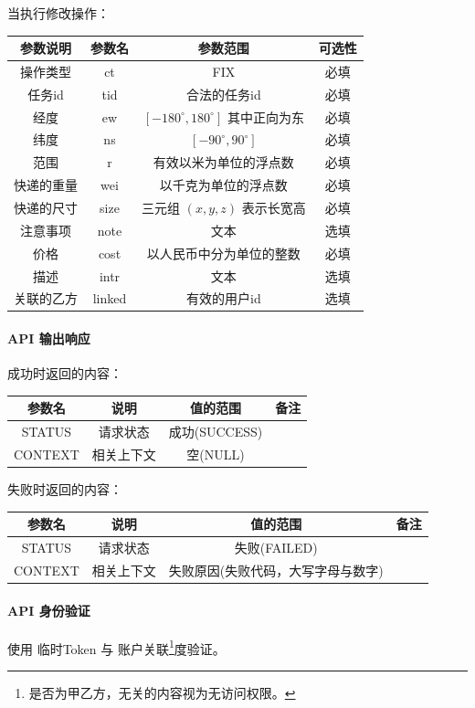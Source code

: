 \documentclass[UTF8]{article}
\def\apiresp{\paragraph{\colorbox[rgb]{0.9,0.9,1}{API 输出响应}}} %
\def\apiauth{\paragraph{\colorbox[rgb]{0.45,0.9,1}{API 身份验证}}} %
\def\失败{\colorbox[rgb]{1,0.5,0.5}{失败}}
\def\成功{\colorbox[rgb]{0.4,1,0.5}{成功}}
\def\成功V{成功(SUCCESS)}
\def\失败V{失败(FAILED)}
\def\失败原因{失败原因(失败代码，大写字母与数字)}
\def\空{空(NULL)}
\begin{document}
    \par 当执行修改操作： \\
    \begin{tabular}{|c|c|c|c|}
        \hline \rule[-2ex]{0pt}{5.5ex} 参数说明 & 参数名 & 参数范围 & 可选性 \\
        \hline \rule[-2ex]{0pt}{5.5ex} 操作类型 & ct & FIX & 必填 \\
        \hline \rule[-2ex]{0pt}{5.5ex} 任务id & tid & 合法的任务id & 必填 \\
        \hline \rule[-2ex]{0pt}{5.5ex} 经度 & ew & $[-180^\circ,180^\circ]$ 其中正向为东 & 必填 \\
        \hline \rule[-2ex]{0pt}{5.5ex} 纬度 & ns & $[-90^\circ,90^\circ]$ & 必填 \\
        \hline \rule[-2ex]{0pt}{5.5ex} 范围 & r & 有效以米为单位的浮点数 & 必填 \\
        \hline \rule[-2ex]{0pt}{5.5ex} 快递的重量 & wei & 以千克为单位的浮点数 & 必填 \\
        \hline \rule[-2ex]{0pt}{5.5ex} 快递的尺寸 & size & 三元组 $(x,y,z)$ 表示长宽高 & 必填 \\
        \hline \rule[-2ex]{0pt}{5.5ex} 注意事项 & note & 文本 & 选填 \\
        \hline \rule[-2ex]{0pt}{5.5ex} 价格 & cost & 以人民币中分为单位的整数 & 必填 \\
        \hline \rule[-2ex]{0pt}{5.5ex} 描述 & intr & 文本 & 选填 \\
        \hline \rule[-2ex]{0pt}{5.5ex} 关联的乙方 & linked & 有效的用户id & 选填 \\
        \hline 
    \end{tabular} 
    \apiresp
    \成功 时返回的内容：\\
    \begin{tabular}{|c|c|c|c|}
        \hline \rule[-2ex]{0pt}{5.5ex} 参数名 & 说明 & 值的范围 & 备注 \\
        \hline \rule[-2ex]{0pt}{5.5ex} STATUS & 请求状态 & \成功V &  \\ 
        \hline \rule[-2ex]{0pt}{5.5ex} CONTEXT & 相关上下文 & \空 &  \\
        \hline 
    \end{tabular} 
    \par \失败 时返回的内容：\\
    \begin{tabular}{|c|c|c|c|}
        \hline \rule[-2ex]{0pt}{5.5ex} 参数名 & 说明 & 值的范围 & 备注 \\
        \hline \rule[-2ex]{0pt}{5.5ex} STATUS & 请求状态 & \失败V &  \\ 
        \hline \rule[-2ex]{0pt}{5.5ex} CONTEXT & 相关上下文 & \失败原因 &  \\
        \hline 
    \end{tabular}
    \apiauth
    使用 临时Token 与 账户关联\footnote{是否为甲乙方，无关的内容视为无访问权限。}度验证。
\end{document}
